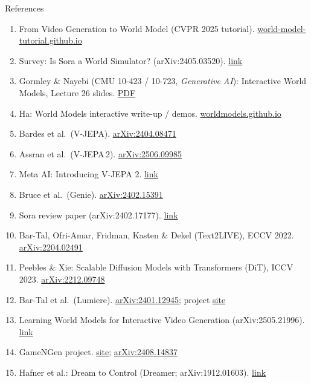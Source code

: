 \begin{frame}[allowframebreaks]{References}
  \setlength{\leftmargini}{1.1em}
  \setlength{\itemsep}{0.09em}
  \begin{enumerate}
    \setlength{\itemsep}{0.07em}
    \item From Video Generation to World Model ({CVPR} 2025 tutorial). \href{https://world-model-tutorial.github.io/}{world-model-tutorial.github.io}
    \item Survey: Is {Sora} a World Simulator? ({arXiv}:2405.03520). \href{https://arxiv.org/abs/2405.03520}{link}
    \item Gormley \& Nayebi ({CMU} 10-423 / 10-723, \emph{Generative AI}): Interactive World Models, Lecture 26 slides. \href{https://www.cs.cmu.edu/~mgormley/courses/10423/slides/lecture26-world-models.pdf}{PDF}
    \item Ha: World Models interactive write-up / demos. \href{https://worldmodels.github.io/}{worldmodels.github.io}
    \item Bardes et al.\ ({V-JEPA}). \href{https://arxiv.org/abs/2404.08471}{arXiv:2404.08471}
    \item Assran et al.\ ({V-JEPA}\,2). \href{https://arxiv.org/abs/2506.09985}{arXiv:2506.09985}
    \item {Meta AI}: Introducing {V-JEPA} 2. \href{https://ai.meta.com/research/vjepa/}{link}
    \item Bruce et al.\ ({Genie}). \href{https://arxiv.org/abs/2402.15391}{arXiv:2402.15391}
    \item {Sora} review paper ({arXiv}:2402.17177). \href{https://arxiv.org/abs/2402.17177}{link}
    \item Bar-Tal, Ofri-Amar, Fridman, Kasten \& Dekel ({Text2LIVE}), {ECCV} 2022. \href{https://arxiv.org/abs/2204.02491}{arXiv:2204.02491}
    \item Peebles \& Xie: Scalable Diffusion Models with Transformers ({DiT}), {ICCV} 2023. \href{https://arxiv.org/abs/2212.09748}{arXiv:2212.09748}
    \item Bar-Tal et al.\ ({Lumiere}). \href{https://arxiv.org/abs/2401.12945}{arXiv:2401.12945}; project \href{https://lumiere-video.github.io/}{site}
    \item Learning World Models for Interactive Video Generation ({arXiv}:2505.21996). \href{https://arxiv.org/abs/2505.21996}{link}
    \item {GameNGen} project. \href{https://gamengen.github.io/}{site}; \href{https://arxiv.org/abs/2408.14837}{arXiv:2408.14837}
    \item Hafner et al.: Dream to Control ({Dreamer}; {arXiv}:1912.01603). \href{https://arxiv.org/abs/1912.01603}{link}

\end{enumerate}
\end{frame}
